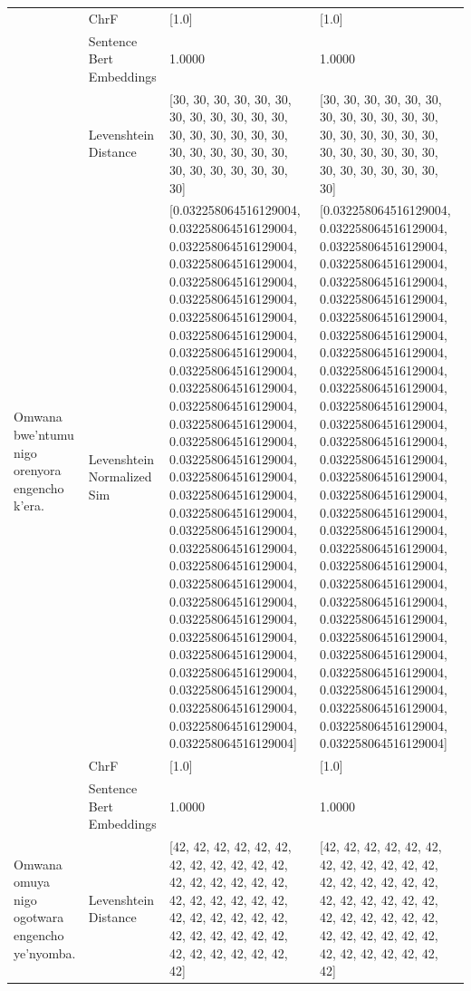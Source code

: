 \begin{tabular}{llll}
 & ChrF & [1.0] & [1.0] \\
 & Sentence Bert Embeddings & 1.0000 & 1.0000 \\
\cline{1-4}
\multirow[t]{4}{*}{Omwana bwe'ntumu nigo orenyora engencho k'era.} & Levenshtein Distance & [30, 30, 30, 30, 30, 30, 30, 30, 30, 30, 30, 30, 30, 30, 30, 30, 30, 30, 30, 30, 30, 30, 30, 30, 30, 30, 30, 30, 30, 30, 30] & [30, 30, 30, 30, 30, 30, 30, 30, 30, 30, 30, 30, 30, 30, 30, 30, 30, 30, 30, 30, 30, 30, 30, 30, 30, 30, 30, 30, 30, 30, 30] \\
 & Levenshtein Normalized Sim & [0.032258064516129004, 0.032258064516129004, 0.032258064516129004, 0.032258064516129004, 0.032258064516129004, 0.032258064516129004, 0.032258064516129004, 0.032258064516129004, 0.032258064516129004, 0.032258064516129004, 0.032258064516129004, 0.032258064516129004, 0.032258064516129004, 0.032258064516129004, 0.032258064516129004, 0.032258064516129004, 0.032258064516129004, 0.032258064516129004, 0.032258064516129004, 0.032258064516129004, 0.032258064516129004, 0.032258064516129004, 0.032258064516129004, 0.032258064516129004, 0.032258064516129004, 0.032258064516129004, 0.032258064516129004, 0.032258064516129004, 0.032258064516129004, 0.032258064516129004, 0.032258064516129004] & [0.032258064516129004, 0.032258064516129004, 0.032258064516129004, 0.032258064516129004, 0.032258064516129004, 0.032258064516129004, 0.032258064516129004, 0.032258064516129004, 0.032258064516129004, 0.032258064516129004, 0.032258064516129004, 0.032258064516129004, 0.032258064516129004, 0.032258064516129004, 0.032258064516129004, 0.032258064516129004, 0.032258064516129004, 0.032258064516129004, 0.032258064516129004, 0.032258064516129004, 0.032258064516129004, 0.032258064516129004, 0.032258064516129004, 0.032258064516129004, 0.032258064516129004, 0.032258064516129004, 0.032258064516129004, 0.032258064516129004, 0.032258064516129004, 0.032258064516129004, 0.032258064516129004] \\
 & ChrF & [1.0] & [1.0] \\
 & Sentence Bert Embeddings & 1.0000 & 1.0000 \\
\cline{1-4}
\multirow[t]{4}{*}{Omwana omuya nigo ogotwara engencho ye'nyomba.} & Levenshtein Distance & [42, 42, 42, 42, 42, 42, 42, 42, 42, 42, 42, 42, 42, 42, 42, 42, 42, 42, 42, 42, 42, 42, 42, 42, 42, 42, 42, 42, 42, 42, 42, 42, 42, 42, 42, 42, 42, 42, 42, 42, 42, 42, 42] & [42, 42, 42, 42, 42, 42, 42, 42, 42, 42, 42, 42, 42, 42, 42, 42, 42, 42, 42, 42, 42, 42, 42, 42, 42, 42, 42, 42, 42, 42, 42, 42, 42, 42, 42, 42, 42, 42, 42, 42, 42, 42, 42] \\

\end{tabular}
